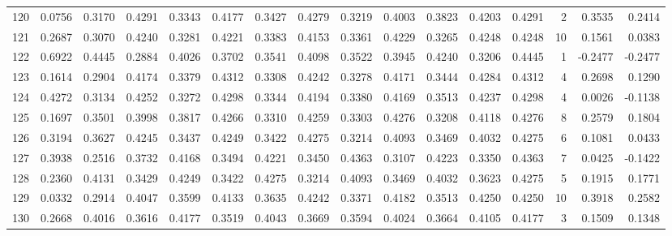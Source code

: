 \begin{tabular}{lrrrrrrrrrrrrrrr}
120 &      0.0756 &  0.3170 &  0.4291 &  0.3343 &  0.4177 &  0.3427 &  0.4279 &  0.3219 &  0.4003 &  0.3823 &   0.4203 &     0.4291 &      2 &                    0.3535 &                     0.2414 \\
121 &      0.2687 &  0.3070 &  0.4240 &  0.3281 &  0.4221 &  0.3383 &  0.4153 &  0.3361 &  0.4229 &  0.3265 &   0.4248 &     0.4248 &     10 &                    0.1561 &                     0.0383 \\
122 &      0.6922 &  0.4445 &  0.2884 &  0.4026 &  0.3702 &  0.3541 &  0.4098 &  0.3522 &  0.3945 &  0.4240 &   0.3206 &     0.4445 &      1 &                   -0.2477 &                    -0.2477 \\
123 &      0.1614 &  0.2904 &  0.4174 &  0.3379 &  0.4312 &  0.3308 &  0.4242 &  0.3278 &  0.4171 &  0.3444 &   0.4284 &     0.4312 &      4 &                    0.2698 &                     0.1290 \\
124 &      0.4272 &  0.3134 &  0.4252 &  0.3272 &  0.4298 &  0.3344 &  0.4194 &  0.3380 &  0.4169 &  0.3513 &   0.4237 &     0.4298 &      4 &                    0.0026 &                    -0.1138 \\
125 &      0.1697 &  0.3501 &  0.3998 &  0.3817 &  0.4266 &  0.3310 &  0.4259 &  0.3303 &  0.4276 &  0.3208 &   0.4118 &     0.4276 &      8 &                    0.2579 &                     0.1804 \\
126 &      0.3194 &  0.3627 &  0.4245 &  0.3437 &  0.4249 &  0.3422 &  0.4275 &  0.3214 &  0.4093 &  0.3469 &   0.4032 &     0.4275 &      6 &                    0.1081 &                     0.0433 \\
127 &      0.3938 &  0.2516 &  0.3732 &  0.4168 &  0.3494 &  0.4221 &  0.3450 &  0.4363 &  0.3107 &  0.4223 &   0.3350 &     0.4363 &      7 &                    0.0425 &                    -0.1422 \\
128 &      0.2360 &  0.4131 &  0.3429 &  0.4249 &  0.3422 &  0.4275 &  0.3214 &  0.4093 &  0.3469 &  0.4032 &   0.3623 &     0.4275 &      5 &                    0.1915 &                     0.1771 \\
129 &      0.0332 &  0.2914 &  0.4047 &  0.3599 &  0.4133 &  0.3635 &  0.4242 &  0.3371 &  0.4182 &  0.3513 &   0.4250 &     0.4250 &     10 &                    0.3918 &                     0.2582 \\
130 &      0.2668 &  0.4016 &  0.3616 &  0.4177 &  0.3519 &  0.4043 &  0.3669 &  0.3594 &  0.4024 &  0.3664 &   0.4105 &     0.4177 &      3 &                    0.1509 &                     0.1348 \\

\end{tabular}
